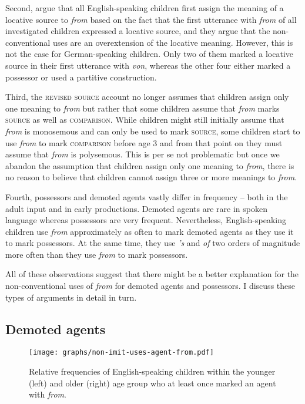 \documentclass[lucida]{sp} %
\begin{document}
Second, \cite{clark1989a} argue that all English-speaking children first assign the meaning of a locative source to \textit{from} based on the fact that the first utterance with \textit{from} of all investigated children expressed a locative source, and they argue that the non-conventional uses are an overextension of the locative meaning. However, this is not the case for German-speaking children. Only two of them marked a locative source in their first utterance with \textit{von}, whereas the other four either marked a possessor or used a partitive construction.

Third, the \textsc{revised source} account no longer assumes that children assign only one meaning to \textit{from} but rather that some children assume that \textit{from} marks \textsc{source} as well as \textsc{comparison}. While children might still initially assume that \textit{from} is monosemous and can only be used to mark \textsc{source}, some children start to use \textit{from} to mark \textsc{comparison} before age 3 and from that point on they must assume that \textit{from} is polysemous. This is per se not problematic but once we abandon the assumption that children assign only one meaning to \textit{from}, there is no reason to believe that children cannot assign three or more meanings to \textit{from}.

Fourth, possessors and demoted agents vastly differ in frequency -- both in the adult input and in early productions. Demoted agents are rare in spoken language whereas possessors are very frequent. Nevertheless, English-speaking children use \textit{from} approximately as often to mark demoted agents as they use it to mark possessors. At the same time, they use \textit{'s} and \textit{of} two orders of magnitude more often than they use \textit{from} to mark possessors. 

All of these observations suggest that there might be a better explanation for the non-conventional uses of \textit{from} for demoted agents and possessors. I discuss these types of arguments in detail in turn.

\subsection{Demoted agents}

\begin{figure}
\hspace{0.25\textwidth}\texttt{[image: graphs/non-imit-uses-agent-from.pdf]}
\caption{Relative frequencies of English-speaking children within the younger (left) and older (right) age group who at least once marked an agent with \textit{from}.}\label{fig:agt-children}
\end{figure}
\end{document}
